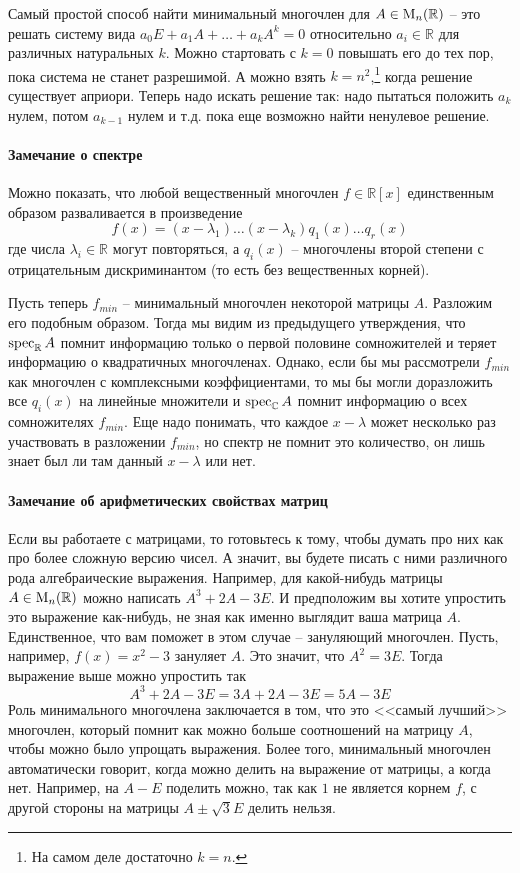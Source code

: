 Самый простой способ найти минимальный многочлен для $A\in\operatorname{M}_{n}(\mathbb R)$ -- это решать систему вида $a_0 E + a_1 A + \ldots + a_k A^k = 0$ относительно $a_i\in\mathbb R$ для различных натуральных $k$. Можно стартовать с $k = 0$ повышать его до тех пор, пока система не станет разрешимой. А можно взять $k = n^2$,\footnote{На самом деле достаточно $k = n$.} когда решение существует априори. Теперь надо искать решение так: надо пытаться положить $a_k$ нулем, потом $a_{k-1}$ нулем и т.д. пока еще возможно найти ненулевое решение.

\paragraph{Замечание о спектре} Можно показать, что любой вещественный многочлен $f\in\mathbb R[x]$ единственным образом разваливается в произведение 
\[
f(x) = (x-\lambda_1)\ldots (x-\lambda_k) q_1(x)\ldots q_r(x)
\]
где числа $\lambda_i\in\mathbb R$ могут повторяться, а $q_i(x)$ -- многочлены второй степени с отрицательным дискриминантом (то есть без вещественных корней). 

Пусть теперь $f_{min}$ -- минимальный многочлен некоторой матрицы $A$. Разложим его подобным образом. Тогда мы видим из предыдущего утверждения, что $\operatorname{spec}_\mathbb RA$ помнит информацию только о первой половине сомножителей и теряет информацию о квадратичных многочленах. Однако, если бы мы рассмотрели $f_{min}$ как многочлен с комплексными коэффициентами, то мы бы могли доразложить все $q_i(x)$ на линейные множители и $\operatorname{spec}_\mathbb CA$ помнит информацию о всех сомножителях $f_{min}$. Еще надо понимать, что каждое $x-\lambda$ может несколько раз участвовать в разложении $f_{min}$, но спектр не помнит это количество, он лишь знает был ли там данный $x-\lambda$ или нет.

\paragraph{Замечание об арифметических свойствах матриц}
Если вы работаете с матрицами, то готовьтесь к тому, чтобы думать про них как про более сложную версию чисел. А значит, вы будете писать с ними различного рода алгебраические выражения. Например, для какой-нибудь матрицы $A\in\operatorname{M}_{n}(\mathbb R)$ можно написать $A^3 + 2 A - 3E$. И предположим вы хотите упростить это выражение как-нибудь, не зная как именно выглядит ваша матрица $A$. Единственное, что вам поможет в этом случае -- зануляющий многочлен. Пусть, например, $f(x) = x^2 - 3$ зануляет $A$. Это значит, что $A^2 = 3 E$. Тогда выражение выше можно упростить так
\[
A^3 + 2 A - 3 E = 3A + 2 A - 3 E = 5A - 3 E
\]
Роль минимального многочлена заключается в том, что это <<самый лучший>> многочлен, который помнит как можно больше соотношений на матрицу $A$, чтобы можно было упрощать выражения. Более того, минимальный многочлен автоматически говорит, когда можно делить на выражение от матрицы, а когда нет. Например, на $A - E$ поделить можно, так как $1$ не является корнем $f$, с другой стороны на матрицы $A \pm\sqrt{3}E$ делить нельзя.


